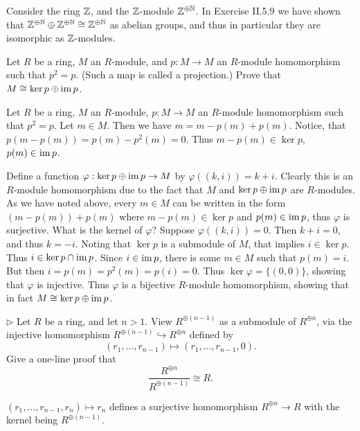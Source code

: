 \begin{solution}
	Consider the ring $\mathbb{Z}$, and the $\mathbb{Z}$-module $\mathbb{Z}^{\oplus \mathbb{N}}$. In Exercise II.5.9 we have shown that $\mathbb{Z}^{\oplus \mathbb{N}} \oplus \mathbb{Z}^{\oplus \mathbb{N}} \cong \mathbb{Z}^{\oplus \mathbb{N}}$ as abelian groups, and thus in particular they are isomorphic as $\mathbb{Z}$-modules.
\end{solution}

\begin{problem}
	Let $R$ be a ring, $M$ an $R$-module, and $p: M \to M$ an $R$-module homomorphism such that $p^2 = p$. (Such a map is called a projection.) Prove that $M \cong \ker p \oplus \operatorname{im} p$.
\end{problem}

\begin{solution}
	Let $R$ be a ring, $M$ an $R$-module, $p: M \to M$ an $R$-module homomorphism such that $p^2 = p$. Let $m \in M$. Then we have $m = m - p(m) + p(m)$. Notice, that $p(m - p(m)) = p(m) - p^2(m) = 0$. Thus $m - p(m) \in \ker p$, $p(m) \in \operatorname{im} p$.
	
	Define a function $\varphi: \ker p \oplus \operatorname{im} p \to M$ by $\varphi((k, i)) = k + i$. Clearly this is an $R$-module homomorphism due to the fact that $M$ and $\ker p \oplus \operatorname{im} p$ are $R$-modules. As we have noted above, every $m \in M$ can be written in the form $(m - p(m)) + p(m)$ where $m - p(m) \in \ker p$ and $p(m) \in \operatorname{im} p$, thus $\varphi$ is surjective. What is the kernel of $\varphi$? Suppose $\varphi((k, i)) = 0$. Then $k + i = 0$, and thus $k = -i$. Noting that $\ker p$ is a submodule of $M$, that implies $i \in \ker p$. Thus $i \in \ker p \cap \operatorname{im} p$. Since $i \in \operatorname{im} p$, there is some $m \in M$ such that $p(m) = i$. But then $i = p(m) = p^2(m) = p(i) = 0$. Thus $\ker \varphi = \{(0, 0)\}$, showing that $\varphi$ is injective. Thus $\varphi$ is a bijective $R$-module homomorphism, showing that in fact $M \cong \ker p \oplus \operatorname{im} p$.
\end{solution}

\begin{problem}
	$\triangleright$ Let $R$ be a ring, and let $n > 1$. View $R^{\oplus(n-1)}$ as a submodule of $R^{\oplus n}$, via the injective homomorphism $R^{\oplus(n-1)} \hookrightarrow R^{\oplus n}$ defined by
	\[
		(r_1, \dots, r_{n-1}) \mapsto (r_1, \dots, r_{n-1}, 0) \text{.}
	\]
	Give a one-line proof that
	\[
		\frac{R^{\oplus n}}{R^{\oplus (n-1)}} \cong R \text{.}
	\]
\end{problem}

\begin{solution}
	$(r_1, \dots, r_{n-1}, r_n) \mapsto r_n$ defines a surjective homomorphism $R^{\oplus n} \to R$ with the kernel being $R^{\oplus (n-1)}$.
\end{solution}

